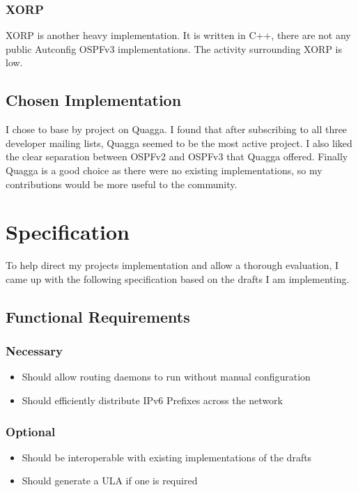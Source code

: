 \documentclass[12pt]{report}
\begin{document}
\subsection{XORP}
XORP\cite{XORPHome} is another heavy implementation. It is written in C++,
there are not any public Autconfig OSPFv3 implementations. The activity
surrounding XORP is low. 

\section{Chosen Implementation}
I chose to base by project on Quagga. I found that after subscribing to all
three developer mailing lists, Quagga seemed to be the most active project.  I
also liked the clear separation between OSPFv2 and OSPFv3 that Quagga offered.
Finally Quagga is a good choice as there were no existing implementations, so
my contributions would be more useful to the community.

\chapter{Specification}
To help direct my projects implementation and allow a thorough evaluation, I
came up with the following specification based on the drafts I am implementing.

\section{Functional Requirements}
\subsection{Necessary}
\begin{itemize}
    \item Should allow routing daemons to run without manual configuration
    \item Should efficiently distribute IPv6 Prefixes across the network
\end{itemize}
\subsection{Optional}
\begin{itemize}
    \item Should be interoperable with existing implementations of the drafts
    \item Should generate a ULA if one is required
\end{itemize}
\end{document}

